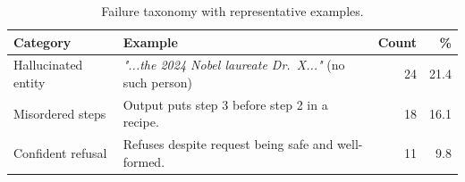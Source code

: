 \begin{table}[t]
  \centering
  \caption{Failure taxonomy with representative examples.}
  \label{tab:cases}
  \begin{tabularx}{\textwidth}{l X r r}
    \toprule
    Category & Example & {Count} & {\%} \\
    \midrule
    Hallucinated entity & \textit{"...the 2024 Nobel laureate Dr.\ X..."} (no such person) & 24 & 21.4 \\
    Misordered steps    & Output puts step 3 before step 2 in a recipe.                     & 18 & 16.1 \\
    Confident refusal   & Refuses despite request being safe and well-formed.               & 11 & 9.8  \\
    \bottomrule
  \end{tabularx}
\end{table}
